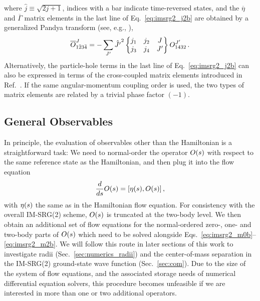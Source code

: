 where $\hat{j}\equiv\sqrt{2j+1}$, indices with a bar indicate time-reversed states, and the $\overline{\eta}$ and $\overline{\Gamma}$ matrix elements in the last line of Eq.~\eqref{eq:imsrg2_j2b} are obtained by a generalized Pandya transform (see, e.g., \cite{Suhonen:2007wo}),
\begin{equation}
  \overline{O}^{J}_{1\bar{2}3\bar{4}} = - \sum_{J'}\hat{J'}^{2} \begin{Bmatrix} j_{1} & j_{2} & J \\ j_{3} & j_{4} & J' \end{Bmatrix}  O^{J'}_{1432}\,.
\end{equation}
Alternatively, the particle-hole terms in the last line of Eq.~\eqref{eq:imsrg2_j2b}
can also be expressed in terms of the cross-coupled matrix elements introduced in
Ref.~\cite{Kuo:1981fk}. If the same angular-momentum coupling order is used, the
two types of matrix elements are related by a trivial phase factor $(-1)$.

\subsection{General Observables\label{sec:observables}}
In principle, the evaluation of observables other than the Hamiltonian is a straightforward task: We need to normal-order the operator $O(s)$ with respect to the same reference state as the Hamiltonian, and then plug it into the flow equation
\begin{equation}\label{eq:obsflow}
  \totd{}{s}\OO(s) = \comm{\etaO(s)}{\OO(s)}\,,
\end{equation} 
with $\eta(s)$ the same as in the Hamiltonian flow equation. For consistency with the overall IM-SRG(2) scheme, $O(s)$ is truncated at the two-body level. We then obtain an additional set of flow equations for the normal-ordered zero-, one- and two-body parts of $O(s)$ which need to be solved alongside Eqs.~\eqref{eq:imsrg2_m0b}--\eqref{eq:imsrg2_m2b}. We will follow this route in later sections of this work to investigate radii (Sec.~\ref{sec:numerics_radii}) and the center-of-mass separation in the IM-SRG(2) ground-state wave function (Sec.~\ref{sec:com}). Due to the size of the system of flow equations, and the associated storage needs of numerical differential equation solvers, this procedure becomes unfeasible if we are interested in more than one or two additional operators.

